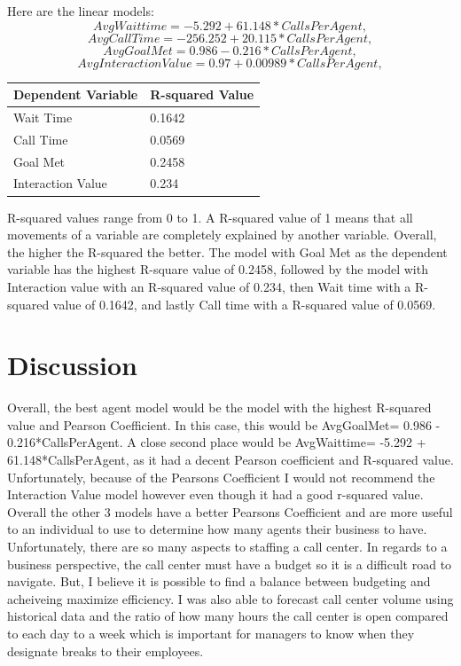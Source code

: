 \documentclass[12pt]{article}
\begin{document}
  Here are the linear models:
  \begin{equation}
    \label{eq:Wait Time}
  AvgWaittime= -5.292 + 61.148*CallsPerAgent,
  \end{equation}
  \begin{equation}
    \label{eq:Call Time}
  AvgCallTime = -256.252 + 20.115*CallsPerAgent,
  \end{equation}
  \begin{equation}
    \label{eq:Goal Met}
  AvgGoalMet= 0.986 - 0.216*CallsPerAgent,
  \end{equation}
  \begin{equation}
    \label{eq:InteractionValue}
  AvgInteractionValue= 0.97 + 0.00989*CallsPerAgent,
  \end{equation}

  \begin{table}[H]
    \resizebox{\textwidth}{!} {
    \begin{tabular}{ l | l |}
      {\bf Dependent Variable} & {\bf R-squared Value}\\
    \hline
    Wait Time& 0.1642 \\
    \hline
    Call Time& 0.0569\\
    \hline
    Goal Met& 0.2458\\
    \hline
    Interaction Value& 0.234\\
    \end{tabular}
    }
    \end{table}
R-squared values range from 0 to 1. A R-squared value of 1 means that all movements of a variable are completely explained by another variable. 
Overall, the higher the R-squared the better. The model with Goal Met as the dependent variable has the highest R-square value of 0.2458, followed by
the model with Interaction value with an R-squared value of 0.234, then Wait time with a R-squared value of 0.1642, and lastly Call time with a R-squared value of 0.0569.
\section*{Discussion}
Overall, the best agent model would be the model with the highest R-squared value and Pearson Coefficient. In this case, this would be
AvgGoalMet= 0.986 - 0.216*CallsPerAgent. A close second place would be AvgWaittime= -5.292 + 61.148*CallsPerAgent, as it had a decent 
Pearson coefficient and R-squared value. Unfortunately, because of the Pearsons Coefficient I would not recommend the Interaction Value model however even though it had a good 
r-squared value. Overall the other 3 models have a better Pearsons Coefficient and are more useful to an individual to use to determine how many agents
their business to have. Unfortunately, there are so many aspects to staffing a call center. In regards to a business perspective, the call center must have
a budget so it is a difficult road to navigate. But, I believe it is possible to find a balance between budgeting and acheiveing maximize efficiency.
I was also able to forecast call center volume using historical data and the ratio of how many hours the call center is open compared to each day to
a week which is important for managers to know when they designate breaks to their employees. 
\end{document}
